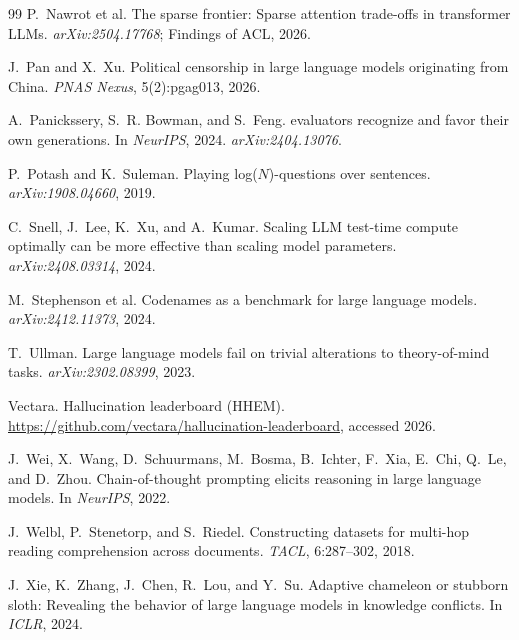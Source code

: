 \documentclass[11pt]{article}
\begin{document}
\begin{thebibliography}{99}
P.~Nawrot et al.
\newblock The sparse frontier: Sparse attention trade-offs in transformer
{LLM}s.
\newblock \emph{arXiv:2504.17768}; Findings of ACL, 2026.

J.~Pan and X.~Xu.
\newblock Political censorship in large language models originating from China.
\newblock \emph{PNAS Nexus}, 5(2):pgag013, 2026.

A.~Panickssery, S.~R. Bowman, and S.~Feng.
 evaluators recognize and favor their own generations.
\newblock In \emph{NeurIPS}, 2024. \emph{arXiv:2404.13076}.

P.~Potash and K.~Suleman.
\newblock Playing log($N$)-questions over sentences.
\newblock \emph{arXiv:1908.04660}, 2019.

C.~Snell, J.~Lee, K.~Xu, and A.~Kumar.
\newblock Scaling {LLM} test-time compute optimally can be more effective than
scaling model parameters.
\newblock \emph{arXiv:2408.03314}, 2024.

M.~Stephenson et al.
\newblock Codenames as a benchmark for large language models.
\newblock \emph{arXiv:2412.11373}, 2024.

T.~Ullman.
\newblock Large language models fail on trivial alterations to theory-of-mind
tasks.
\newblock \emph{arXiv:2302.08399}, 2023.

Vectara.
\newblock Hallucination leaderboard (HHEM).
\newblock \url{https://github.com/vectara/hallucination-leaderboard}, accessed
2026.

J.~Wei, X.~Wang, D.~Schuurmans, M.~Bosma, B.~Ichter, F.~Xia, E.~Chi, Q.~Le, and
D.~Zhou.
\newblock Chain-of-thought prompting elicits reasoning in large language models.
\newblock In \emph{NeurIPS}, 2022.

J.~Welbl, P.~Stenetorp, and S.~Riedel.
\newblock Constructing datasets for multi-hop reading comprehension across
documents.
\newblock \emph{TACL}, 6:287--302, 2018.

J.~Xie, K.~Zhang, J.~Chen, R.~Lou, and Y.~Su.
\newblock Adaptive chameleon or stubborn sloth: Revealing the behavior of large
language models in knowledge conflicts.
\newblock In \emph{ICLR}, 2024.


\end{thebibliography}
\end{document}
